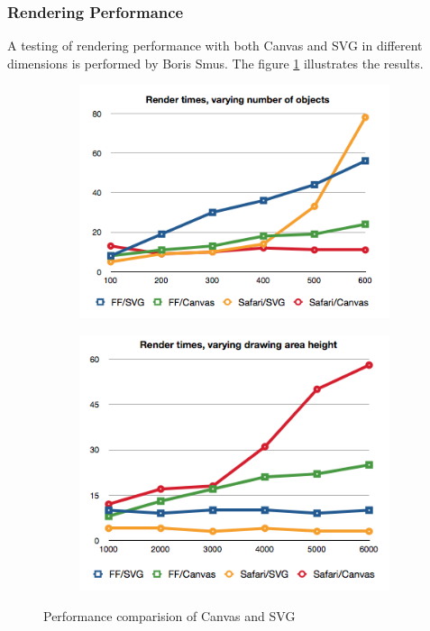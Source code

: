 \subsubsection{Rendering Performance}

A testing of rendering performance with both Canvas and SVG in different dimensions is performed by Boris Smus\cite{CanvasSVGcompare}. The figure \ref{fig:perf-comp-canvas-svg-tech} illustrates the results.

\begin{figure}[!htbp]
\centering
\begin{subfigure}{.5\textwidth}
  \centering
  \includegraphics[width=1\textwidth]{Figures/tech-svg-canvas-compare-2.png}
\end{subfigure}%
\begin{subfigure}{.5\textwidth}
  \centering
  \includegraphics[width=1\textwidth]{Figures/tech-svg-canvas-compare-1.png}
\end{subfigure}
\caption{Performance comparision of Canvas and SVG}
\label{fig:perf-comp-canvas-svg-tech}
\end{figure}

